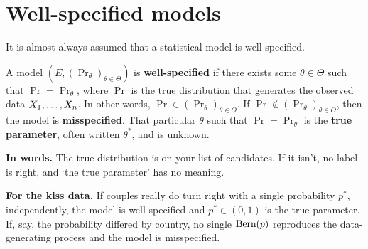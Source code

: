 \section{Well-specified models}
\label{sec:models-wellspecified}

It is almost always assumed that a statistical model is well-specified.

\begin{definition}
\label{def:wellspecified}
A model $\left(E, (\Pr_\theta)_{\theta \in \Theta }\right)$ is \textbf{well-specified} if there exists some $\theta \in \Theta$ such that $\Pr = \Pr_{\theta}$, where $\Pr$ is the true distribution that generates the observed data $X_1, \ldots, X_n$.
In other words, $\Pr \in (\Pr_{\theta})_{\theta \in \Theta}$.
If $\Pr \notin (\Pr_{\theta})_{\theta \in \Theta}$, then the model is \textbf{misspecified}.
That particular $\theta$ such that $\Pr = \Pr_{\theta}$ is the \textbf{true parameter}, often written $\theta^*$, and is unknown.
\end{definition}

\begin{inwords}
\textbf{In words.} The true distribution is on your list of candidates. If it isn't, no label is right, and `the true parameter' has no meaning.
\par\smallskip
\textbf{For the kiss data.} If couples really do turn right with a single probability $p^*$, independently, the model is well-specified and $p^* \in (0,1)$ is the true parameter. If, say, the probability differed by country, no single $\text{Bern}(p)$ reproduces the data-generating process and the model is misspecified.
\end{inwords}

\begin{center}
\end{center}

